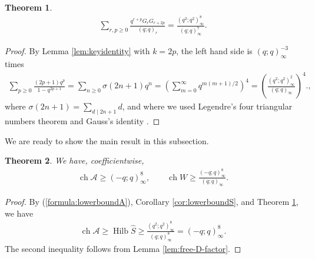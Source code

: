 \documentclass[11pt]{amsart}
\newtheorem{theorem}{Theorem}[section]
\theoremstyle{definition}
\theoremstyle{remark}
\DeclareMathOperator{\ch}{ch}
\begin{document}
\begin{theorem}\label{thm:lowerboundS}
\begin{align*}
\sum_{r,p\geq 0}\frac{q^{r+p}G_rG_{r+2p}}{(q;q)_r}=\frac{(q^2;q^2)^8_{\infty}}{(q;q)^7_{\infty}}. 	
\end{align*}
\end{theorem}
\begin{proof}
By Lemma \ref{lem:keyidentity} with $k=2p$, the left hand side is $(q;q)_\infty^{-3}$ times
\begin{align*}
\sum_{p\geq 0}\frac{(2p+1)q^p}{1-q^{2p+1}}=\sum_{n\geq 0} \sigma(2n+1)q^n=\left(\sum_{m=0}^{\infty}q^{m(m+1)/2}\right)^4=\left(\frac{(q^2;q^2)^2_{\infty}}{(q;q)_{\infty}}\right)^4. ,	
\end{align*}
where $\sigma(2n+1)=\displaystyle\sum_{d\mid 2n+1} d$, and where we used Legendre's four triangular numbers theorem
\cite[Theorem 3]{ORW} and Gauss's identity \cite[Corollary 2.10]{Andrews}.
\end{proof}
We are ready to show the main result in this subsection. 
\begin{theorem}\label{theorem:lowerbound A}
We have, coefficientwise,
\begin{align*}
\ch\mathcal{A}\geq (-q;q)_{\infty}^8, \quad\quad \ch W\geq \frac{(-q;q)_{\infty}^8}{(q;q)_{\infty}}. 
\end{align*}
\end{theorem}
\begin{proof}
By (\ref{formula:lowerboundA}), Corollary \ref{cor:lowerboundS}, and Theorem \ref{thm:lowerboundS}, we have
\begin{align*}
\ch \mathcal{A}\geq \operatorname{Hilb}\widehat{S}\geq \frac{(q^2;q^2)_{\infty}^8}{(q;q)_{\infty}^8}=(-q;q)_\infty^8.
\end{align*}
The second inequality follows from Lemma \ref{lem:free-D-factor}. 
\end{proof}
\end{document}
